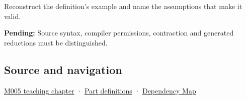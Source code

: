 Reconstruct the definition's example and name the assumptions that make it valid.

\textbf{Pending:} Source syntax, compiler permissions, contraction and generated reductions must be distinguished.

\subsection{Source and navigation}\label{appendix-c2ac4a84c283-source-and-navigation}

\hyperref[01-foundations-i-ch001-when-arithmetic-meets-uncertainty]{M005 teaching chapter} · \hyperref[appendix-fd090d982a15-m005---parts-77-88]{Part definitions} · \hyperref[appendix-4ad47bdd269a]{Dependency Map}
